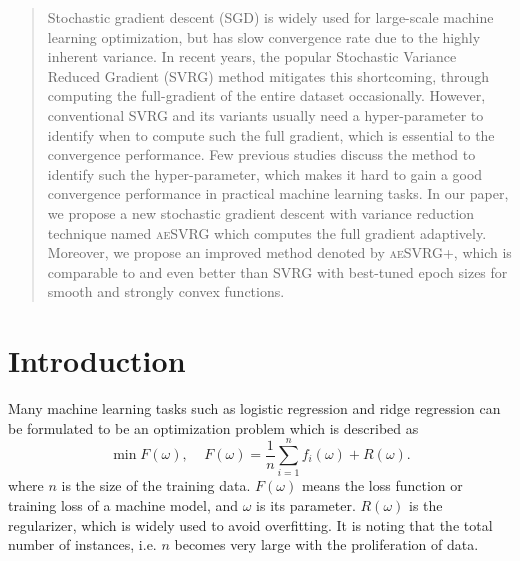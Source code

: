 \documentclass[conference]{IEEEtran}
\begin{document}

\maketitle

\begin{abstract}
    Stochastic gradient descent (SGD) is widely used for large-scale machine learning optimization, but has slow convergence rate due to the highly inherent variance. In recent years, the popular Stochastic Variance Reduced Gradient (SVRG) method mitigates this shortcoming, through computing the full-gradient of the entire dataset occasionally. However, conventional SVRG and its variants usually need a hyper-parameter to identify when to compute such the full gradient, which is essential to the convergence performance. Few previous studies discuss the method to identify such the hyper-parameter, which makes it hard to gain a good convergence performance in practical machine learning tasks.  In our paper, we propose a new stochastic gradient descent with variance reduction technique named \textsc{aeSVRG} which computes the full gradient adaptively.  Moreover, we propose an improved method denoted by \textsc{aeSVRG+}, which is comparable to and even better than SVRG with best-tuned epoch sizes for smooth and strongly convex functions.


\end{abstract}


%
\IEEEpeerreviewmaketitle



\section{Introduction}
Many machine learning tasks such as logistic regression and ridge regression can be formulated to be an optimization problem which is described as 
\begin{equation}
\label{equation_loss_minimization}
\min F(\omega),~~~~~F(\omega)=\frac{1}{n}\sum\limits_{i=1}^n f_i(\omega)+R(\omega).
\end{equation}
where $n$ is the size of the training data. $F(\omega)$ means the loss function or training loss of a machine model, and $\omega$ is its parameter. $R(\omega)$ is the regularizer, which is widely used to avoid overfitting. It is noting that the total number of instances, i.e. $n$ becomes very large with the proliferation of data. 
\end{document}

